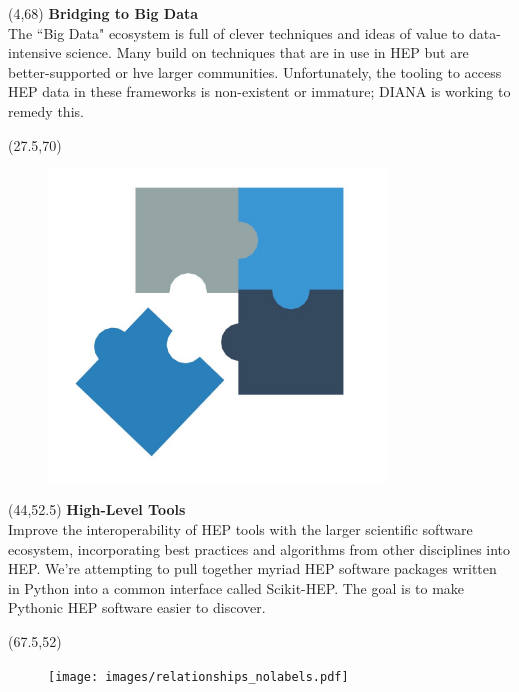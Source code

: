 \documentclass[final]{beamer}
\begin{document}
\begin{frame}{}

\begin{textblock}{22.5}(4,68)
\textcolor{mybluelabel}{\bf Bridging to Big Data} \\
The ``Big Data" ecosystem is full of clever techniques and ideas of value to data-intensive science.
Many build on techniques that are in use in HEP but are better-supported or hve larger communities.
Unfortunately, the tooling to access HEP data in these frameworks is non-existent or immature;
DIANA is working to remedy this.
\end{textblock}

\begin{textblock}{12.5}(27.5,70)
\begin{figure}[tbph]
\centering
\includegraphics[width=0.8\textwidth]{images/interoperable.jpg}
\end{figure}
\end{textblock}


\begin{textblock}{22.5}(44,52.5)
\textcolor{mybluelabel}{\bf High-Level Tools} \\
Improve the interoperability of HEP tools with the larger scientific software ecosystem, incorporating best practices and algorithms from other disciplines into HEP.
We're attempting to pull together myriad HEP software packages written in Python into a common interface called Scikit-HEP.
The goal is to make Pythonic HEP software easier to discover.
\end{textblock}

\begin{textblock}{12.5}(67.5,52)
\begin{figure}[tbph]
\centering
\texttt{[image: images/relationships\_nolabels.pdf]}
\end{figure}
\end{textblock}


\end{frame}
\end{document}
